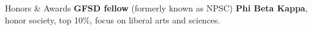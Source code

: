 \begin{rubric}{Honors \& Awards}
\entry*[2021] \textbf{GFSD fellow} (formerly known as NPSC) %
\entry*[2018] \textbf{Phi Beta Kappa}, honor society, top 10\%, focus on liberal arts and sciences.
\end{rubric}